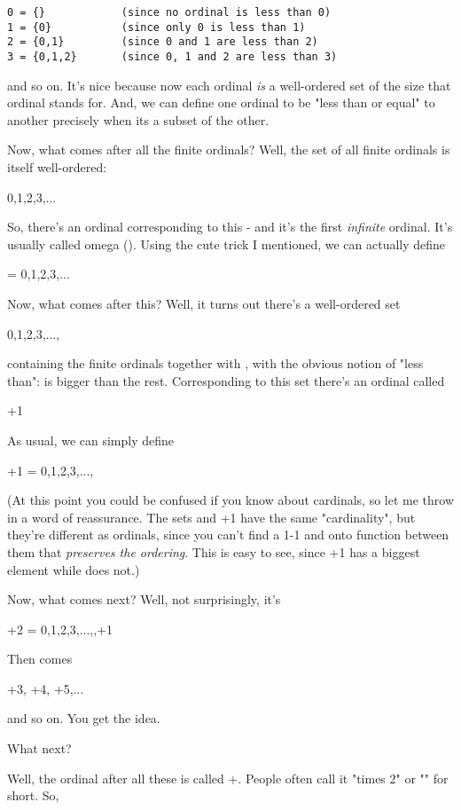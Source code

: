 \begin{verbatim}
0 = {}            (since no ordinal is less than 0) 
1 = {0}           (since only 0 is less than 1)  
2 = {0,1}         (since 0 and 1 are less than 2)
3 = {0,1,2}       (since 0, 1 and 2 are less than 3)
\end{verbatim}
    
and so on.   It's nice because now each ordinal \emph{is} a
well-ordered set of the size that ordinal stands for.
And, we can define one ordinal to be "less than or equal" to
another precisely when its a subset of the other.

Now, what comes after all the finite ordinals?  Well,
the set of all finite ordinals is itself well-ordered:

{0,1,2,3,...}

So, there's an ordinal corresponding to this - and it's the first
\emph{infinite} ordinal.  It's usually called omega (\omega ).
Using the cute trick I mentioned, we can actually define

\omega  = {0,1,2,3,...}

Now, what comes after this?  Well, it turns out there's a
well-ordered set

{0,1,2,3,...,\omega }

containing the finite ordinals together with \omega , with the
obvious notion of "less than": \omega  is bigger than the rest.  
Corresponding to this set there's an ordinal called

\omega +1

As usual, we can simply define

\omega +1 = {0,1,2,3,...,\omega }

(At this point you could be confused if you know about cardinals,
so let me throw in a word of reassurance.  The sets \omega  and
\omega +1 have the same "cardinality", but they're different as 
ordinals, since you can't find a 1-1 and onto function between 
them that \emph{preserves the ordering}.  This is easy to see, since
\omega +1 has a biggest element while \omega  does not.)

Now, what comes next?  Well, not surprisingly, it's

\omega +2 = {0,1,2,3,...,\omega ,\omega +1}
 
Then comes 

\omega +3, \omega +4, \omega +5,...

and so on.  You get the idea.

What next?  

Well, the ordinal after all these is called \omega +\omega .  People
often call it "\omega  times 2" or "" for
short.  So,

